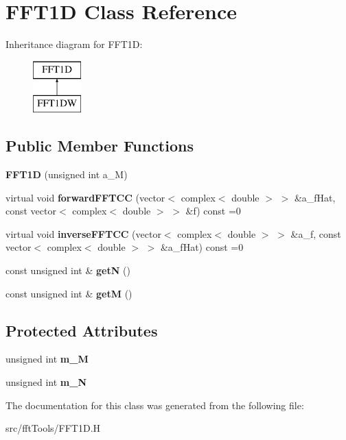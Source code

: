 \hypertarget{class_f_f_t1_d}{}\section{F\+F\+T1D Class Reference}
\label{class_f_f_t1_d}
Inheritance diagram for F\+F\+T1D\+:\begin{figure}[H]
\begin{center}
\leavevmode
\includegraphics[height=2.000000cm]{class_f_f_t1_d}
\end{center}
\end{figure}
\subsection*{Public Member Functions}
\begin{DoxyCompactItemize}
\item 
\mbox{\label{class_f_f_t1_d_a43ff9aee84ed44bb71b8334e41267da8}} 
{\bfseries F\+F\+T1D} (unsigned int a\+\_\+M)
\item 
\mbox{\label{class_f_f_t1_d_a66ca6abdacadd9d77c9d1f39ab508202}} 
virtual void {\bfseries forward\+F\+F\+T\+CC} (vector$<$ complex$<$ double $>$ $>$ \&a\+\_\+f\+Hat, const vector$<$ complex$<$ double $>$ $>$ \&f) const =0
\item 
\mbox{\label{class_f_f_t1_d_aa8611e6f021a752e60675b33741214c7}} 
virtual void {\bfseries inverse\+F\+F\+T\+CC} (vector$<$ complex$<$ double $>$ $>$ \&a\+\_\+f, const vector$<$ complex$<$ double $>$ $>$ \&a\+\_\+f\+Hat) const =0
\item 
\mbox{\label{class_f_f_t1_d_a808e5d0c9b29c846e1ebff94b8474897}} 
const unsigned int \& {\bfseries getN} ()
\item 
\mbox{\label{class_f_f_t1_d_a4b9470b228d9284224f653f6b0700371}} 
const unsigned int \& {\bfseries getM} ()
\end{DoxyCompactItemize}
\subsection*{Protected Attributes}
\begin{DoxyCompactItemize}
\item 
\mbox{\label{class_f_f_t1_d_a7cc11c775917dc9ab05b87712720a208}} 
unsigned int {\bfseries m\+\_\+M}
\item 
\mbox{\label{class_f_f_t1_d_ac9b2fd31fea75c4101f658f104ebd182}} 
unsigned int {\bfseries m\+\_\+N}
\end{DoxyCompactItemize}


The documentation for this class was generated from the following file\+:\begin{DoxyCompactItemize}
\item 
src/fft\+Tools/F\+F\+T1\+D.\+H\end{DoxyCompactItemize}
